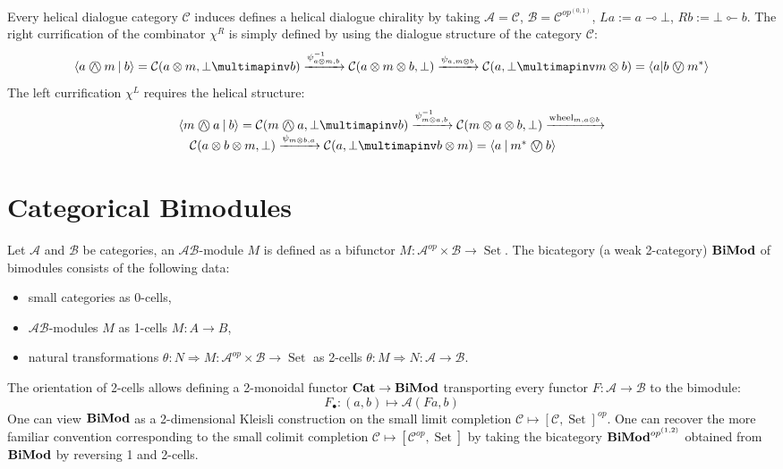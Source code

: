 \documentclass[8pt]{article}
\theoremstyle{definition}
\theoremstyle{definition}
\theoremstyle{definition}
\theoremstyle{definition}
\theoremstyle{definition}
\theoremstyle{definition}
\theoremstyle{definition}
\theoremstyle{definition}
\theoremstyle{definition}
\theoremstyle{definition}
\theoremstyle{definition}
\theoremstyle{definition}
\theoremstyle{definition}
\theoremstyle{definition}
\theoremstyle{question}
\newcommand{\circvee}{\mathbin{\text{\ooalign{\hfil$\vee$\hfil\cr\kern0.1ex$\bigcirc$}}}}
\newcommand{\circwedge}{\mathbin{\text{\ooalign{\hfil$\wedge$\hfil\cr\kern0.1ex$\bigcirc$}}}}
\begin{document}
Every helical dialogue category $\mathcal{C}$ induces defines a helical dialogue chirality by taking
$\mathcal{A} = \mathcal{C}$, $\mathcal{B} = \mathcal{C}^{op^{(0,1)}}$, $La := a \multimap \bot$, 
$Rb := \bot \multimapinv b$. The right currification of the combinator $\chi^R$ is simply defined
by using the dialogue structure of the category $\mathcal{C}$:
\[
\langle a \circwedge m \: | \: b \rangle = \mathcal{C}(a \otimes m, \bot \multimapinv b) \xrightarrow{\psi^{-1}_{a \otimes m, b}} \mathcal{C}(a \otimes m \otimes b, \bot) \xrightarrow{\psi_{a, m \otimes b}} \mathcal{C}(a, \bot \multimapinv m \otimes b) = \langle a | b \circvee m^* \rangle 
\]
The left currification $\chi^L$ requires the helical structure:
\[
\begin{array}{lll}
& \langle m \circwedge a \: | \: b \rangle = \mathcal{C}(m \circwedge a, \bot \multimapinv b) \xrightarrow{\psi^{-1}_{m \otimes a, b}} \mathcal{C}(m \otimes a \otimes b, \bot) \xrightarrow{\operatorname{wheel}_{m, a \otimes b}}& \\ 
& \:\:\:\: \mathcal{C}(a \otimes b \otimes m, \bot) \xrightarrow{\psi_{m \otimes b, a}} \mathcal{C}(a, \bot \multimapinv b \otimes m) = \langle a \: | \: m^* \circvee b \rangle &
\end{array}
\]

\section{Categorical Bimodules}

Let $\mathcal{A}$ and $\mathcal{B}$ be categories, an $\mathcal{A}\mathcal{B}$-module $M$ is defined as a bifunctor
$M : \mathcal{A}^{op} \times \mathcal{B} \to \operatorname{Set}$. The bicategory (a weak 2-category) ${\bf BiMod}$ of bimodules consists of
the following data:
\begin{itemize}
  \item small categories as 0-cells,
  \item $\mathcal{A}\mathcal{B}$-modules $M$ as 1-cells $M : A \to B$,
  \item natural transformations $\theta : N \Rightarrow M : \mathcal{A}^{op} \times \mathcal{B} \to \operatorname{Set}$ as 2-cells
  $\theta : M \Rightarrow N : \mathcal{A} \to \mathcal{B}$.
\end{itemize}
The orientation of 2-cells allows defining a 2-monoidal functor ${\bf Cat} \to {\bf BiMod}$ transporting every functor
$F : \mathcal{A} \to \mathcal{B}$ to the bimodule:
\[
F_{\bullet} : (a, b) \mapsto \mathcal{A}(Fa, b)
\]
One can view ${\bf BiMod}$ as a 2-dimensional Kleisli construction on the small limit completion 
$\mathcal{C} \mapsto [\mathcal{C}, \operatorname{Set}]^{op}$. One can recover the more familiar
convention corresponding to the small colimit completion $\mathcal{C} \mapsto [\mathcal{C}^{op}, \operatorname{Set}]$
by taking the bicategory ${\bf BiMod}^{op^{(1,2)}}$ obtained from ${\bf BiMod}$ by reversing 1 and 2-cells.
\end{document}
